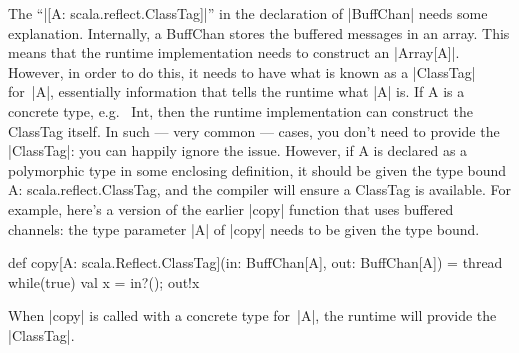The ``|[A: scala.reflect.ClassTag]|'' in the declaration of |BuffChan| needs
some explanation. Internally, a {\scalashape BuffChan} stores the buffered
messages in an array.  This means that the runtime implementation needs to
construct an |Array[A]|.  However, in order to do this, it needs to have what
is known as a |ClassTag| for~|A|, essentially information that tells the
runtime what |A| is.  If {\scalashape A} is a concrete type, e.g.~{\scalashape
  Int}, then the runtime implementation can construct the {\scalashape
  ClassTag} itself.  In such --- very common --- cases, you don't need to
provide the |ClassTag|: you can happily ignore the issue.  However, if
{\scalashape A} is declared as a polymorphic type in some enclosing
definition, it should be given the type bound {\scalashape A:
  scala.reflect.ClassTag}, and the compiler will ensure a {\scalashape
  ClassTag} is available.  For example, here's a version of the earlier |copy|
function that uses buffered channels: the type parameter |A| of |copy| needs
to be given the type bound.
%
\begin{scala}
def copy[A: scala.Reflect.ClassTag](in: BuffChan[A], out: BuffChan[A]) = thread{
  while(true){ val x = in?(); out!x }
}
\end{scala}
%
When |copy| is called with a concrete type for~|A|, the runtime will provide
the |ClassTag|. 


